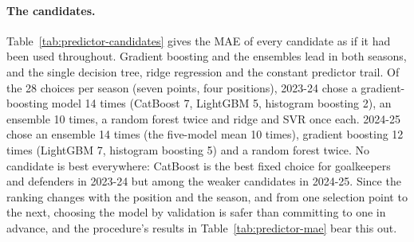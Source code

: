\paragraph{The candidates.} Table~\ref{tab:predictor-candidates} gives the MAE of every
candidate as if it had been used throughout. Gradient boosting and the ensembles lead in both
seasons, and the single decision tree, ridge regression and the constant predictor trail. Of
the 28 choices per season (seven points, four positions), 2023-24 chose a gradient-boosting
model 14 times (CatBoost 7, LightGBM 5, histogram boosting 2), an ensemble 10 times, a random
forest twice and ridge and SVR once each. 2024-25 chose an ensemble 14 times (the five-model mean
10 times), gradient boosting 12 times (LightGBM 7, histogram boosting 5) and a random forest
twice. No candidate is best everywhere: CatBoost is the best fixed choice for goalkeepers and
defenders in 2023-24 but among the weaker candidates in 2024-25. Since the ranking changes with
the position and the season, and from one selection point to the next, choosing the model by
validation is safer than committing to one in advance, and the procedure's results in
Table~\ref{tab:predictor-mae} bear this out.

